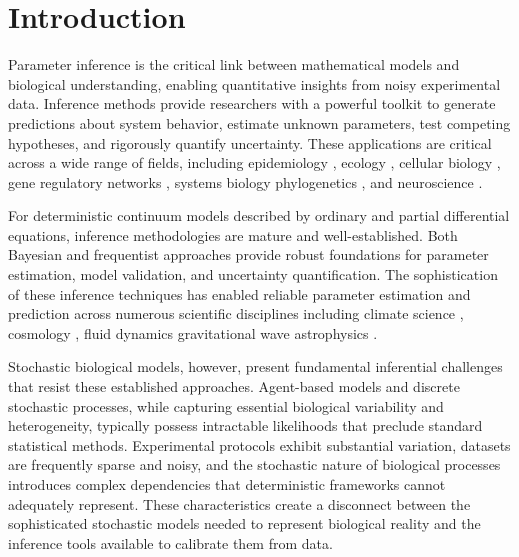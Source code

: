 \documentclass{article}
\begin{document}
\section{Introduction}
Parameter inference is the critical link between mathematical models and biological understanding, enabling quantitative insights from noisy experimental data. Inference methods provide researchers with a powerful toolkit to generate predictions about system behavior, estimate unknown parameters, test competing hypotheses, and rigorously quantify uncertainty. These applications are critical across a wide range of fields, including epidemiology \citep{Dunson2005,Semochkina2025}, ecology \citep{Qian2009,Rosen2001}, cellular biology \citep{Vallejos2015}, gene regulatory networks \citep{Liu2016,Wang2019}, systems biology \citep{Rabinowitz2013} phylogenetics \citep{Nascimento2017}, and neuroscience \citep{Coventry2024}.

For deterministic continuum models described by ordinary and partial differential equations, inference methodologies are mature and well-established. Both Bayesian \citep{Bernardo1994,Gelman1995} and frequentist \citep{Cox1974,Casella1990} approaches provide robust foundations for parameter estimation, model validation, and uncertainty quantification. The sophistication of these inference techniques has enabled reliable parameter estimation and prediction across numerous scientific disciplines including climate science \citep{Vrugt2014}, cosmology \citep{Planck2018Params}, fluid dynamics \citep{Cheung2011} gravitational wave astrophysics \citep{Veitch2015}. 

Stochastic biological models, however, present fundamental inferential challenges that resist these established approaches. Agent-based models and discrete stochastic processes, while capturing essential biological variability and heterogeneity, typically possess intractable likelihoods that preclude standard statistical methods. Experimental protocols exhibit substantial variation, datasets are frequently sparse and noisy, and the stochastic nature of biological processes introduces complex dependencies that deterministic frameworks cannot adequately represent. These characteristics create a disconnect between the sophisticated stochastic models needed to represent biological reality and the inference tools available to calibrate them from data.
\end{document}
